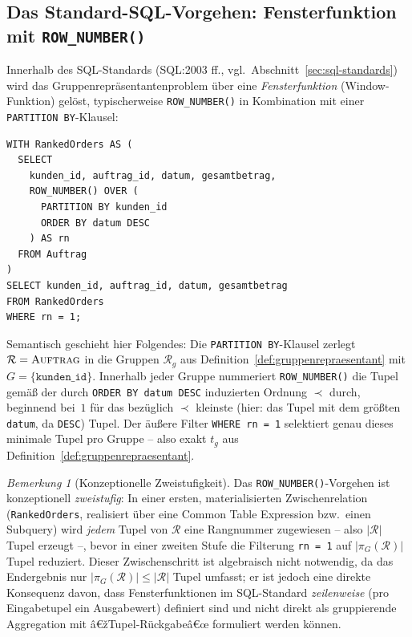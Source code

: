 ﻿\documentclass[a4paper,12pt]{report}
\theoremstyle{definition}
\theoremstyle{remark}
\newtheorem{remark}{Bemerkung}[chapter]
\newcommand{\R}{\mathcal{R}}
\begin{document}
\subsection{Das Standard-SQL-Vorgehen: Fensterfunktion mit \texttt{ROW\_NUMBER()}}
\label{sec:row-number}

Innerhalb des SQL-Standards (SQL:2003 ff., vgl.\
Abschnitt~\ref{sec:sql-standards}) wird das
Gruppenrepräsentantenproblem über eine \emph{Fensterfunktion}
(Window-Funktion) gelöst, typischerweise \texttt{ROW\_NUMBER()} in
Kombination mit einer \texttt{PARTITION BY}-Klausel:

\begin{lstlisting}
WITH RankedOrders AS (
  SELECT
    kunden_id, auftrag_id, datum, gesamtbetrag,
    ROW_NUMBER() OVER (
      PARTITION BY kunden_id
      ORDER BY datum DESC
    ) AS rn
  FROM Auftrag
)
SELECT kunden_id, auftrag_id, datum, gesamtbetrag
FROM RankedOrders
WHERE rn = 1;
\end{lstlisting}

Semantisch geschieht hier Folgendes: Die \texttt{PARTITION
BY}-Klausel zerlegt $\R=\textsc{Auftrag}$ in die Gruppen $\R_g$ aus
Definition~\ref{def:gruppenrepraesentant} mit
$G=\{\texttt{kunden\_id}\}$. Innerhalb jeder Gruppe nummeriert
\texttt{ROW\_NUMBER()} die Tupel gemäß der durch \texttt{ORDER BY
datum DESC} induzierten Ordnung $\prec$ durch, beginnend bei~$1$ für
das bezüglich $\prec$ kleinste (hier: das Tupel mit dem größten
\texttt{datum}, da \texttt{DESC}) Tupel. Der äußere Filter
\texttt{WHERE rn = 1} selektiert genau dieses minimale Tupel pro
Gruppe -- also exakt $t_g$ aus
Definition~\ref{def:gruppenrepraesentant}.

\begin{remark}[Konzeptionelle Zweistufigkeit]
\label{rem:zweistufig}
Das \texttt{ROW\_NUMBER()}-Vorgehen ist konzeptionell
\emph{zweistufig}: In einer ersten, materialisierten
Zwischenrelation (\texttt{RankedOrders}, realisiert über eine
Common Table Expression bzw.\ einen Subquery) wird \emph{jedem}
Tupel von $\R$ eine Rangnummer zugewiesen -- also $|\R|$ Tupel
erzeugt --, bevor in einer zweiten Stufe die Filterung
\texttt{rn = 1} auf $|\pi_G(\R)|$ Tupel reduziert. Dieser
Zwischenschritt ist algebraisch nicht notwendig, da das Endergebnis
nur $|\pi_G(\R)|\leq|\R|$ Tupel umfasst; er ist jedoch eine direkte
Konsequenz davon, dass Fensterfunktionen im SQL-Standard
\emph{zeilenweise} (pro Eingabetupel ein Ausgabewert) definiert sind
und nicht direkt als gruppierende Aggregation mit â€žTupel-Rückgabeâ€œ
formuliert werden können.
\end{remark}
\end{document}
